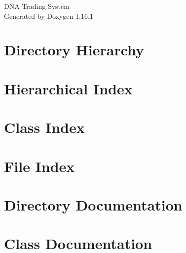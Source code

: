 \documentclass[twoside]{book}
\newcommand{\+}{\discretionary{\mbox{\scriptsize$\hookleftarrow$}}{}{}}
\newcommand{\clearemptydoublepage}{%
    \newpage{\pagestyle{empty}\cleardoublepage}%
  }
\begin{document}
  \raggedbottom
    \hypersetup{pageanchor=false,
                bookmarksnumbered=true,
                pdfencoding=unicode
               }
  \begin{titlepage}
  \vspace*{7cm}
  \begin{center}%
  {\Large DNA Trading System}\\
  \vspace*{1cm}
  {\large Generated by Doxygen 1.16.1}\\
  \end{center}
  \end{titlepage}
  \clearemptydoublepage
  \tableofcontents
  \clearemptydoublepage
  \hypersetup{pageanchor=true}
\chapter{Directory Hierarchy}

\chapter{Hierarchical Index}

\chapter{Class Index}

\chapter{File Index}

\chapter{Directory Documentation}










\chapter{Class Documentation}
















\end{document}

